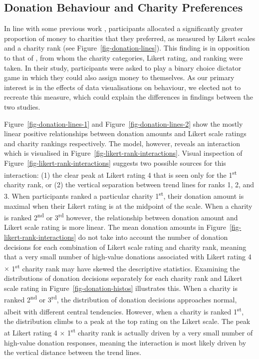 \documentclass[
  authoryear,
  preprint,
  3p]{elsarticle}
\begin{document}
\subsection{Donation Behaviour and Charity
Preferences}\label{donation-behaviour-and-charity-preferences}

In line with some previous work \citep{breeze_2013, berman_2018},
participants allocated a significantly greater proportion of money to
charities that they preferred, as measured by Likert scales and a
charity rank (see Figure~\ref{fig-donation-lines}). This finding is in
opposition to that of \citet{she_2023}, from whom the charity
categories, Likert rating, and ranking were taken. In their study,
participants were asked to play a binary choice dictator game in which
they could also assign money to themselves. As our primary interest is
in the effects of data visualisations on behaviour, we elected not to
recreate this measure, which could explain the differences in findings
between the two studies.

Figure~\ref{fig-donation-lines-1} and Figure~\ref{fig-donation-lines-2}
show the mostly linear positive relationships between donation amounts
and Likert scale ratings and charity rankings respectively. The model,
however, reveals an interaction which is visualised in
Figure~\ref{fig-likert-rank-interactions}. Visual inspection of
Figure~\ref{fig-likert-rank-interactions} suggests two possible sources
for this interaction: (1) the clear peak at Likert rating 4 that is seen
only for the 1\textsuperscript{st} charity rank, or (2) the vertical
separation between trend lines for ranks 1, 2, and 3. When participants
ranked a particular charity 1\textsuperscript{st}, their donation amount
is maximal when their Likert rating is at the midpoint of the scale.
When a charity is ranked 2\textsuperscript{nd} or 3\textsuperscript{rd}
however, the relationship between donation amount and Likert scale
rating is more linear. The mean donation amounts in
Figure~\ref{fig-likert-rank-interactions} do not take into account the
number of donation decisions for each combination of Likert scale rating
and charity rank, meaning that a very small number of high-value
donations associated with Likert rating 4 \(\times\)
1\textsuperscript{st} charity rank may have skewed the descriptive
statistics. Examining the distributions of donation decisions separately
for each charity rank and Likert scale rating in
Figure~\ref{fig-donation-histos} illustrates this. When a charity is
ranked 2\textsuperscript{nd} or 3\textsuperscript{rd}, the distribution
of donation decisions approaches normal, albeit with different central
tendencies. However, when a charity is ranked 1\textsuperscript{st}, the
distribution climbs to a peak at the top rating on the Likert scale. The
peak at Likert rating 4 \(\times\) 1\textsuperscript{st} charity rank is
actually driven by a very small number of high-value donation responses,
meaning the interaction is most likely driven by the vertical distance
between the trend lines.
\end{document}
